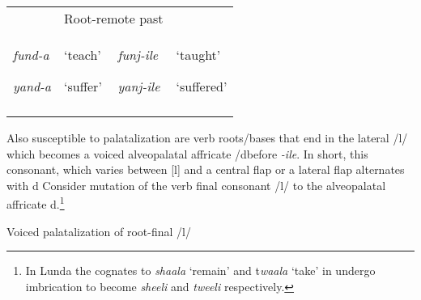 \documentclass[output=paper]{langsci/langscibook}
\begin{document}
\begin{tabular}{llll}
\lsptoprule
\multicolumn{2}{l}{\mdseries Root-FV} & \multicolumn{2}{l}{\mdseries Root-remote past}\\
{\mdseries \emph{fund-a }}

\mdseries \emph{yand-a} & {\mdseries ‘teach’}

\mdseries ‘suffer’ & {\mdseries \emph{funj-ile }}

\mdseries \emph{yanj-ile} & {\mdseries ‘taught’}

\mdseries ‘suffered’\\
\lspbottomrule
\end{tabular}
Also susceptible to palatalization are verb roots/bases that end in the lateral /l/ which becomes a voiced alveopalatal affricate /dbefore \textit{{}-ile}. In short, this consonant, which varies between [l] and a central flap \textstyleipa{[ɾ]} or a lateral flap \textstyleipa{[ɺ], }alternates with \textstyleipa{/}d Consider mutation of the verb final consonant /l/ to the alveopalatal affricate \textstyleipa{/}d.\footnote{ In Lunda the cognates to \textit{shaala} ‘remain’ and t\textit{waala }‘take’ in  undergo imbrication to become \textit{sheeli} and \textit{tweeli} respectively.}

\begin{stylelsTableHeading}%
\begin{table}
\caption{Voiced palatalization of root-final /l/}
\label{tab:12}
\end{table}\end{stylelsTableHeading}
\end{document}
